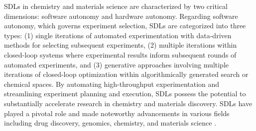 SDLs in chemistry and materials science are characterized by two critical dimensions: software autonomy and hardware autonomy. Regarding software autonomy, which governs experiment selection, SDLs are categorized into three types: (1) single iterations of automated experimentation with data-driven methods for selecting subsequent experiments, (2) multiple iterations within closed-loop systems where experimental results inform subsequent rounds of automated experiments, and (3) generative approaches involving multiple iterations of closed-loop optimization within algorithmically generated search or chemical spaces. By automating high-throughput experimentation and streamlining experiment planning and execution, SDLs possess the potential to substantially accelerate research in chemistry and materials discovery. SDLs have played a pivotal role and made noteworthy advancements in various fields including drug discovery, genomics, chemistry, and materials science \cite{Tom2024}.